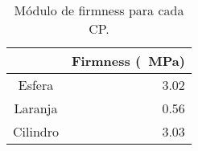 \begin{table}[H]
\centering
\begin{tabular}{c|r|}
\cline{2-2}
\multicolumn{1}{r|}{} & \multicolumn{1}{c|}{Firmness (\SI{}{\mega\pascal})} \\ \hline
\multicolumn{1}{|c|}{Esfera} & 3.02 \\ \hline
\multicolumn{1}{|c|}{Laranja} & 0.56 \\ \hline
\multicolumn{1}{|c|}{Cilindro} & 3.03 \\ \hline
\end{tabular}
\caption{Módulo de firmness para cada CP.}
\label{tab:firmness}
\end{table}